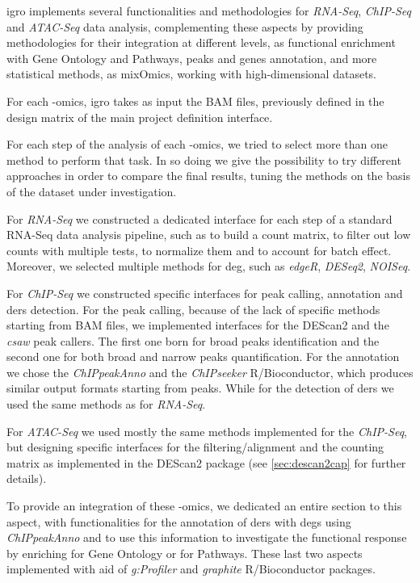 \gls{igro} implements several functionalities and methodologies for \textit{RNA-Seq}, \textit{ChIP-Seq} and \textit{ATAC-Seq} data analysis, complementing these aspects by providing methodologies for their integration at different levels, as functional enrichment with Gene Ontology and Pathways,  peaks and genes annotation, and more statistical methods, as mixOmics, working with high-dimensional datasets.

For each -omics, \gls{igro} takes as input the BAM files, previously defined in the design matrix of the main project definition interface.

For each step of the analysis of each -omics, we tried to select more than one method to perform that task. 
In so doing we give the possibility to try different approaches in order to compare the final results, tuning the methods on the basis of the dataset under investigation.

For \textit{RNA-Seq} we constructed a dedicated interface for each step of a standard RNA-Seq data analysis pipeline, such as to build a count matrix, to filter out low counts with multiple tests, to normalize them and to account for batch effect. 
Moreover, we selected multiple methods for \gls{deg}, such as \textit{edgeR}, \textit{DESeq2}, \textit{NOISeq}.

For \textit{ChIP-Seq} we constructed specific interfaces for peak calling, annotation and \glspl{der} detection.
For the peak calling, because of the lack of specific methods starting from BAM files, we implemented interfaces for the DEScan2 and the \textit{csaw}\cite{Lun2015} peak callers. The first one born for broad peaks identification and the second one for both broad and narrow peaks quantification.
For the annotation we chose the \textit{ChIPpeakAnno} and the \textit{ChIPseeker} R/Bioconductor, which produces similar output formats starting from peaks. While for the detection of \glspl{der} we used the same methods as for \textit{RNA-Seq}.

For \textit{ATAC-Seq} we used mostly the same methods implemented for the \textit{ChIP-Seq}, but designing specific interfaces for the filtering/alignment and the counting matrix as implemented in the DEScan2 package (see \ref{sec:descan2cap} for further details).

To provide an integration of these -omics, we dedicated an entire section to this aspect, with functionalities for the annotation of \glspl{der} with \glspl{deg} using \textit{ChIPpeakAnno} and to use this information to investigate the functional response by enriching for Gene Ontology or for Pathways.
These last two aspects implemented with aid of \textit{g:Profiler} \cite{Reimand2016} and \textit{graphite} \cite{Sales2012a} R/Bioconductor packages.


